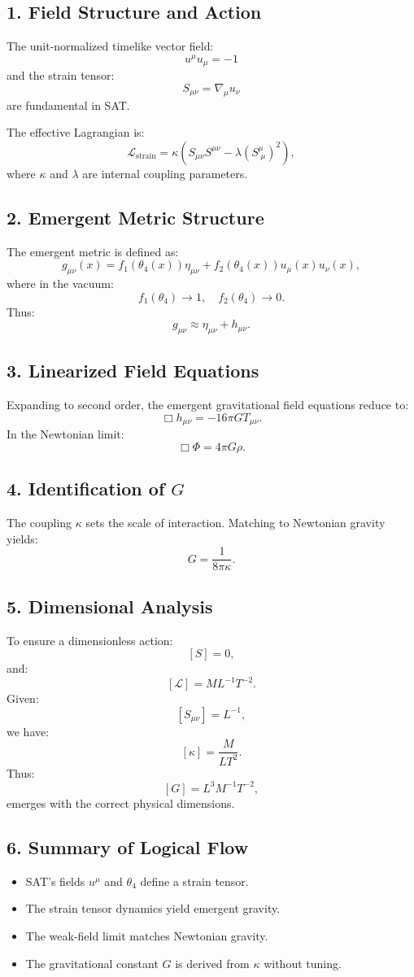 \documentclass[12pt]{article}
\begin{document}
\subsection*{1. Field Structure and Action}
The unit-normalized timelike vector field:
\[
u^\mu u_\mu = -1
\]
and the strain tensor:
\[
S_{\mu\nu} = \nabla_\mu u_\nu
\]
are fundamental in SAT.

The effective Lagrangian is:
\[
\mathcal{L}_\text{strain} = \kappa \left( S_{\mu\nu} S^{\mu\nu} - \lambda (S^\mu_{\;\mu})^2 \right),
\]
where \(\kappa\) and \(\lambda\) are internal coupling parameters.

\subsection*{2. Emergent Metric Structure}
The emergent metric is defined as:
\[
g_{\mu\nu}(x) = f_1(\theta_4(x)) \eta_{\mu\nu} + f_2(\theta_4(x)) u_\mu(x) u_\nu(x),
\]
where in the vacuum:
\[
f_1(\theta_4) \to 1, \quad f_2(\theta_4) \to 0.
\]
Thus:
\[
g_{\mu\nu} \approx \eta_{\mu\nu} + h_{\mu\nu}.
\]

\subsection*{3. Linearized Field Equations}
Expanding to second order, the emergent gravitational field equations reduce to:
\[
\Box h_{\mu\nu} = -16 \pi G T_{\mu\nu}.
\]
In the Newtonian limit:
\[
\Box \Phi = 4\pi G \rho.
\]

\subsection*{4. Identification of \(G\)}
The coupling \(\kappa\) sets the scale of interaction. Matching to Newtonian gravity yields:
\[
G = \frac{1}{8\pi \kappa}.
\]

\subsection*{5. Dimensional Analysis}
To ensure a dimensionless action:
\[
[S] = 0,
\]
and:
\[
[\mathcal{L}] = M L^{-1} T^{-2}.
\]
Given:
\[
[S_{\mu\nu}] = L^{-1},
\]
we have:
\[
[\kappa] = \frac{M}{L T^2}.
\]
Thus:
\[
[G] = L^3 M^{-1} T^{-2},
\]
emerges with the correct physical dimensions.

\subsection*{6. Summary of Logical Flow}
\begin{itemize}
    \item SAT’s fields \(u^\mu\) and \(\theta_4\) define a strain tensor.
    \item The strain tensor dynamics yield emergent gravity.
    \item The weak-field limit matches Newtonian gravity.
    \item The gravitational constant \(G\) is derived from \(\kappa\) without tuning.
\end{itemize}
\end{document}
